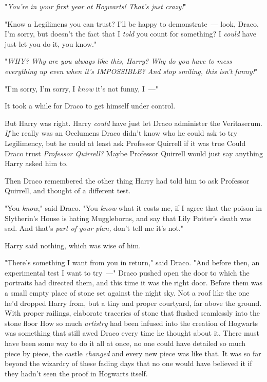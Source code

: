"\emph{You're in your first year at Hogwarts! That's just crazy!}"

"Know a Legilimens you can trust? I'll be happy to demonstrate~--- look, Draco,
I'm sorry, but doesn't the fact that I \emph{told} you count for something? I
\emph{could} have just let you do it, you know."

"\emph{WHY? Why are you always like this, Harry? Why do you have to mess
everything up even when it's IMPOSSIBLE? And stop smiling, this isn't funny!}"

"I'm sorry, I'm sorry, I \emph{know} it's not funny, I~---"

It took a while for Draco to get himself under control.

But Harry was right. Harry \emph{could} have just let Draco administer the
Veritaserum. \emph{If} he really was an Occlumens{\el} Draco didn't know who
he could ask to try Legilimency, but he could at least ask Professor Quirrell
if it was true{\el} Could Draco trust \emph{Professor Quirrell?} Maybe
Professor Quirrell would just say anything Harry asked him to.

Then Draco remembered the other thing Harry had told him to ask Professor
Quirrell, and thought of a different test.

"You \emph{know}," said Draco. "You \emph{know} what it costs me, if I agree
that the poison in Slytherin's House is hating Muggleborns, and say that Lily
Potter's death was sad. And that's \emph{part of your plan,} don't tell me it's
not."

Harry said nothing, which was wise of him.

"There's something I want from you in return," said Draco. "And before then, an
experimental test I want to try~---"
\sbreak
Draco pushed open the door to which the portraits had directed them, and this
time it was the right door. Before them was a small empty place of stone set
against the night sky. Not a roof like the one he'd dropped Harry from, but a
tiny and proper courtyard, far above the ground. With proper railings,
elaborate traceries of stone that flushed seamlessly into the stone
floor{\el} How so much \emph{artistry} had been infused into the creation of
Hogwarts was something that still awed Draco every time he thought about it.
There must have been some way to do it all at once, no one could have detailed
so much piece by piece, the castle \emph{changed} and every new piece was like
that. It was so far beyond the wizardry of these fading days that no one would
have believed it if they hadn't seen the proof in Hogwarts itself.

